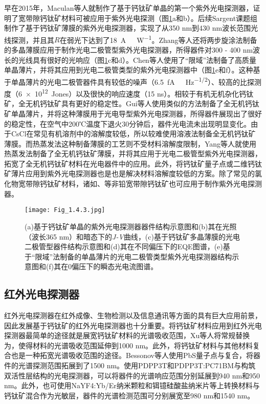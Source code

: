 \documentclass[forlib]{WHUMaster}   %
\begin{document}
{早在2015年，Maculan等人就制作了基于钙钛矿单晶的第一个紫外光电探测器，证明了宽带隙钙钛矿材料可被应用于紫外光电探测（图\ref{fig:1.4.3}a和b）\cite{RN127}。后续Sargent课题组制作了基于钙钛矿薄膜的紫外光电探测器，实现了从350 nm到430 nm波长范围光线探测，并且其$R$在弱光下达到了18\ \si{A\ W^{-1}}\cite{RN126}。Zhang等人还将两步旋涂法制备的多晶薄膜应用于制作光电二极管型紫外光电探测器，所得器件对300 - 400 nm波长的光线具有很好的光响应（图\ref{fig:1.4.3}c和d）\cite{RN156}。Chen等人使用了“限域”法制备了高质量单晶薄片，并将其应用到光电二极管类型的紫外光电探测器中（图\ref{fig:1.4.3}e和f）\cite{RN157}。这种基于单晶薄片的光电二极管器件具有较低的噪声（6.5\ \si{fA\ Hz^{-1/2}}）、较高的比探测度（\num{6e12}\ Jones）以及很快的响应速度（15 ns）。相较于有机无机杂化钙钛矿，全无机钙钛矿具有更好的稳定性。Gui等人使用类似的方法制备了全无机钙钛矿单晶薄片，并将这种薄膜用于光电导型紫外光电探测器，所得器件展现出了很好的稳定性，在空气中200℃温度下退火30分钟后，器件光电流未出现明显变化\cite{RN89}。由于CsCl在常见有机溶剂中的溶解度较低，所以较难使用溶液法制备全无机钙钛矿薄膜\cite{RN137,RN89,RN90}。而热蒸发法这种制备薄膜的工艺则不受材料溶解度限制，Yang等人就使用热蒸发法制备了全无机钙钛矿薄膜，并将其应用于光电二极管型紫外光电探测器，拓宽了全无机钙钛矿材料在光电器件中的应用\cite{RN90}。此外，将钙钛矿量子点\cite{RN159}或二维钙钛矿薄片\cite{RN160}应用到紫外光电探测器也是也是解决材料溶解度较低的方案。除了常见的氯化物宽带隙钙钛矿材料，诸如\cite{RN161}、\cite{RN162}等非铅宽带隙钙钛矿也可应用于制作紫外光电探测器。

\begin{figure}[ht]
\centering
  \texttt{[image: Fig\_1.4.3.jpg]}
  \caption{\rm (a)基于钙钛矿单晶的紫外光电探测器器件结构示意图和(b)其在光照（波长365 nm）和暗态下的\emph{J-V}曲线\cite{RN127}，(c)基于钙钛矿多晶薄膜的光电二极管型器件结构示意图和(d)其在不同偏压下的EQE图谱\cite{RN156}，(e)基于“限域”法制备的单晶薄片的光电二极管类型紫外光电探测器结构示意图和(f)其在0偏压下的瞬态光电流图谱\cite{RN157}。}
  \label{fig:1.4.3}
\end{figure}

\subsection{红外光电探测器}

红外光电探测器在红外成像、生物检测以及信息通讯等方面的具有巨大应用前景，因此发展基于钙钛矿的红外光电探测器也十分重要。将钙钛矿材料应用到红外光电探测器最简单的途径就是展宽钙钛矿材料的光谱吸收范围，Xu等人将常规替换为，使得材料的光谱吸收范围延伸到1000 nm\cite{RN163}。此外，将钙钛矿材料与其他材料复合也是一种拓宽光谱吸收范围的途径。Bessonov等人使用PbS量子点与复合，将器件的光谱探测范围拓展到了1500 nm。\cite{RN164}使用PDPP3T\cite{RN165}和PDPP3T:PC71BM\cite{RN166}与构筑双活性层结构的光电探测器，可以将器件的光谱响应范围分别延展到940 nm和950 nm。此外，也可使用NaYF4:Yb/Er纳米颗粒\cite{RN167}和铒镱硅酸盐纳米片\cite{RN168}等上转换材料与钙钛矿混合作为光敏层，器件的光谱检测范围可分别展宽至980 nm和1540 nm。

}
\end{document}
